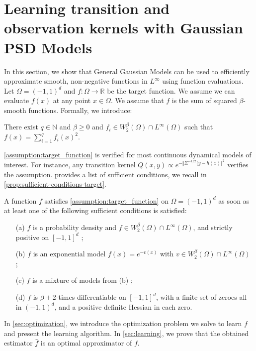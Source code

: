 \section{Learning transition and observation kernels with Gaussian PSD Models}\label{sec:learning-gaussian-psd}
In this section, we show that General Gaussian Models can be used to efficiently approximate smooth, non-negative functions in $L^\infty$ using function evaluations. Let $\Omega = (-1, 1)^d$ and $f: \Omega \to \mathbb R$ be the target function. We assume we can evaluate $f(x)$ at any point $x\in\Omega$. We assume that $f$ is the sum of squared $\beta$-smooth functions. Formally, we introduce:

\begin{assumption}\label{assumption:target_function}
    There exist $q \in\mathbb N$ and $\beta \geq 0$ and $f_i \in W^\beta_2(\Omega) \cap L^\infty(\Omega)$ such that $f(x) = \sum_{i=1}^q f_i(x)^2$.
\end{assumption}

\cref{assumption:target_function} is verified for most continuous dynamical models of interest. For instance, any transition kernel $Q(x, y) \propto e^{-\Vert \Sigma^{-1/2}(y - h(x)\Vert^2}$ verifies the assumption. \cite{ciliberto2021} provides a list of sufficient conditions, we recall in \cref{prop:sufficient-conditions-target}.

\begin{proposition}\label{prop:sufficient-conditions-target}
A function $f$ satisfies \cref{assumption:target_function} on $\Omega = (-1, 1)^d$ as soon as at least one of the following sufficient conditions is satisfied:
\begin{itemize}
    \item[(a)] $f$ is a probability density and $f\in W_2^\beta(\Omega)\cap L^\infty(\Omega)$, and strictly positive on $[-1, 1]^d$ ;
    \item[(b)] $f$ is an exponential model $f(x) = e^{-v(x)}$ with $v\in W_2^\beta(\Omega) \cap L^\infty(\Omega)$ ;
    \item[(c)] $f$ is a mixture of models from (b) ;
    \item[(d)] $f$ is $\beta+2$-times differentiable on $[-1, 1]^d$, with a finite set of zeroes all in $(-1, 1)^d$, and a positive definite Hessian in each zero.
\end{itemize}
\end{proposition}
%
In \cref{sec:optimization}, we introduce the optimization problem we solve to learn $f$ and present the learning algorithm. In \cref{sec:learning}, we prove that the obtained estimator $\hat f$ is an optimal approximator of $f$.

